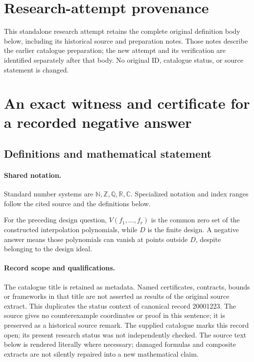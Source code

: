 \documentclass[11pt]{article}
\begin{document}
\section*{Research-attempt provenance}
This standalone research attempt retains the complete original definition body below,
including its historical source and preparation notes. Those notes describe the
earlier catalogue preparation; the new attempt and its verification are identified
separately after that body. No original ID, catalogue status, or source statement is changed.

\section{An exact witness and certificate for a recorded negative answer}\label{statement}

\subsection{Definitions and mathematical statement}

\paragraph{Shared notation.}Standard number systems are $\mathbb N,\mathbb Z,\mathbb Q,\mathbb R,\mathbb C$. Specialized notation and index ranges follow the cited source and the definitions below.


For the preceding design question, $V(f_1,\ldots,f_r)$ is the common zero set of the constructed interpolation polynomials, while $D$ is the finite design. A negative answer means those polynomials can vanish at points outside $D$, despite belonging to the design ideal.
\paragraph{Record scope and qualifications.}
The catalogue title is retained as metadata. Named certificates, contracts, bounds or frameworks in that title are not asserted as results of the original source extract.
This duplicates the status context of canonical record 20001223. The source gives no counterexample coordinates or proof in this sentence; it is preserved as a historical source remark. The supplied catalogue marks this record open; its present research status was not independently checked.
The source text below is rendered literally where necessary; damaged formulas and composite extracts are not silently repaired into a new mathematical claim.
\end{document}
